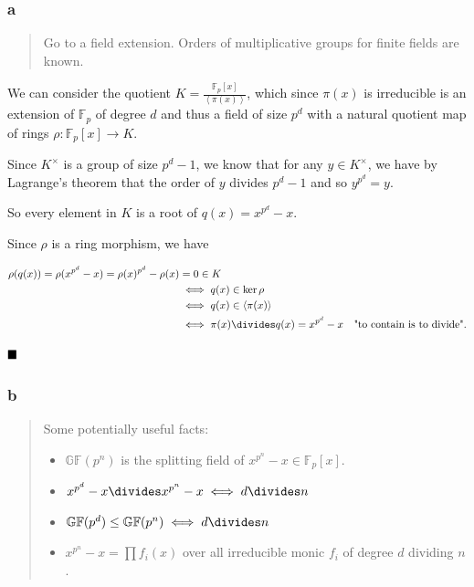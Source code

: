 \begin{solution}

\hypertarget{a-54}{%
\subsubsection{a}\label{a-54}}

\begin{quote}
Go to a field extension. Orders of multiplicative groups for finite
fields are known.
\end{quote}

We can consider the quotient
\(K = \displaystyle{\frac{{\mathbb{F}}_p[x]}{\left\langle{\pi(x)}\right\rangle}}\),
which since \(\pi(x)\) is irreducible is an extension of
\({\mathbb{F}}_p\) of degree \(d\) and thus a field of size \(p^d\) with
a natural quotient map of rings \(\rho: {\mathbb{F}}_p[x] \to K\).

Since \(K^{\times}\) is a group of size \(p^d-1\), we know that for any
\(y \in K^{\times}\), we have by Lagrange's theorem that the order of
\(y\) divides \(p^d-1\) and so \(y^{p^d} = y\).

So every element in \(K\) is a root of \(q(x) = x^{p^d}-x\).

Since \(\rho\) is a ring morphism, we have

\begin{align*}
\rho(q(x)) = \rho(x^{p^d} - x) = \rho(x)^{p^d} - \rho(x)
&= 0 \in K \\
&\iff q(x) \in \ker \rho \\
&\iff q(x) \in \left\langle{\pi(x)}\right\rangle \\
&\iff \pi(x) \divides q(x) = x^{p^d}-x \quad\text{"to contain is to divide"}
.\end{align*}

\(\hfill\blacksquare\)

\hypertarget{b-44}{%
\subsubsection{b}\label{b-44}}

\begin{quote}
Some potentially useful facts:

\begin{itemize}
\tightlist
\item
  \({\mathbb{GF}}(p^n)\) is the splitting field of
  \(x^{p^n} - x \in {\mathbb{F}}_p[x]\).
\item
  \(x^{p^d} - x \divides x^{p^n} - x \iff d \divides n\)
\item
  \({\mathbb{GF}}(p^d) \leq {\mathbb{GF}}(p^n) \iff d\divides n\)
\item
  \(x^{p^n} - x = \prod f_i(x)\) over all irreducible monic \(f_i\) of
  degree \(d\) dividing \(n\).
\end{itemize}
\end{quote}


\end{solution}
